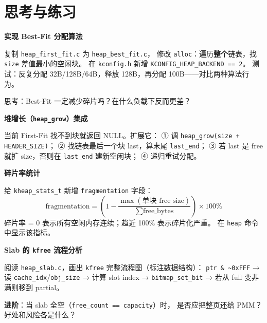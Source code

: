 \section{思考与练习}

\begin{exercise}
\textbf{实现 Best-Fit 分配算法}

复制 \texttt{heap\_first\_fit.c} 为 \texttt{heap\_best\_fit.c}，
修改 \texttt{alloc}：遍历\textbf{整个}链表，找 \texttt{size} 差值最小的空闲块。
在 \texttt{kconfig.h} 新增 \texttt{KCONFIG\_HEAP\_BACKEND == 2}。
测试：反复分配 32B/128B/64B，释放 128B，再分配 100B——对比两种算法行为。

思考：Best-Fit 一定减少碎片吗？在什么负载下反而更差？
\end{exercise}

\begin{exercise}
\textbf{堆增长（\texttt{heap\_grow}）集成}

当前 First-Fit 找不到块就返回 NULL。扩展它：
① 调 \texttt{heap\_grow(size + HEADER\_SIZE)}；
② 找链表最后一个块 last，算末尾 \texttt{last\_end}；
③ 若 last 是 free 就扩 size，否则在 \texttt{last\_end} 建新空闲块；
④ 递归重试分配。
\end{exercise}

\begin{exercise}
\textbf{碎片率统计}

给 \texttt{kheap\_stats\_t} 新增 \texttt{fragmentation} 字段：
$$\text{fragmentation} = \left(1 - \frac{\max(\text{单块 free size})}
  {\sum \text{free\_bytes}}\right) \times 100\%$$
碎片率 = 0 表示所有空闲内存连续；趋近 100\% 表示碎片化严重。
在 \texttt{heap} 命令中显示该指标。
\end{exercise}

\begin{exercise}
\textbf{Slab 的 \texttt{kfree} 流程分析}

阅读 \texttt{heap\_slab.c}，画出 \texttt{kfree} 完整流程图（标注数据结构）：
\texttt{ptr \& \~{}0xFFF} → 读 \texttt{cache\_idx}/\texttt{obj\_size} →
计算 slot index → \texttt{bitmap\_set\_bit} → 若从 full 变非满则移到 partial。

\textbf{进阶}：当 slab 全空（\texttt{free\_count == capacity}）时，
是否应把整页还给 PMM？好处和风险各是什么？
\end{exercise}

